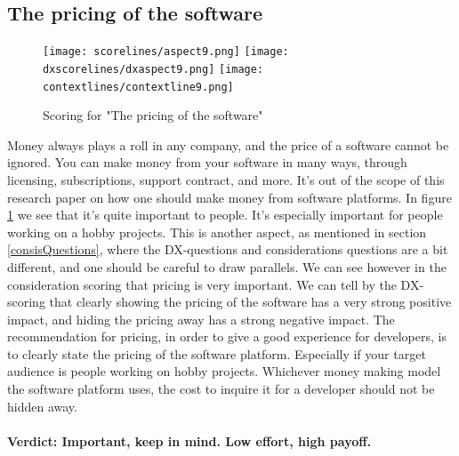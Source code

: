 \documentclass{cslthse-msc}
\begin{document}
    \subsection{The pricing of the software}
    \begin{figure}[H]
        \centering
        \texttt{[image: scorelines/aspect9.png]}
        \texttt{[image: dxscorelines/dxaspect9.png]}
        \texttt{[image: contextlines/contextline9.png]}
        \caption{Scoring for "The pricing of the software"}
        \label{fig:aspect9}
    \end{figure}
    Money always plays a roll in any company, and the price of a software cannot be ignored. You can make money from your software in many ways, through licensing, subscriptions, support contract, and more. It's out of the scope of this research paper on how one should make money from software platforms. In figure \ref{fig:aspect9} we see that it's quite important to people. It's especially important for people working on a hobby projects. This is another aspect, as mentioned in section \ref{consisQuestions}, where the DX-questions and considerations questions are a bit different, and one should be careful to draw parallels. We can see however in the consideration scoring that pricing is very important. We can tell by the DX-scoring that clearly showing the pricing of the software has a very strong positive impact, and hiding the pricing away has a strong negative impact. The recommendation for pricing, in order to give a good experience for developers, is to clearly state the pricing of the software platform. Especially if your target audience is people working on hobby projects. Whichever money making model the software platform uses, the cost to inquire it for a developer should not be hidden away. \\ \\
    \textbf{Verdict: Important, keep in mind. Low effort, high payoff.}
\end{document}

